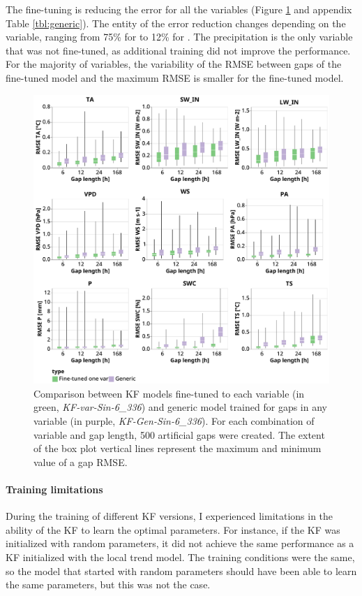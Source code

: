 \documentclass{article}
\newcommand{\imgwidth}{6in}
\begin{document}
The fine-tuning is reducing the error for all the variables (Figure \ref{fig:generic} and appendix Table \ref{tbl:generic}). The entity of the error reduction changes depending on the variable, ranging from 75\% for  to 12\% for .
The precipitation is the only variable that was not fine-tuned, as additional training did not improve the performance.
For the majority of variables, the variability of the RMSE between gaps of the fine-tuned model and the maximum RMSE is smaller for the fine-tuned model.

\begin{figure}
\centerline{\includegraphics[width=\imgwidth]{generic}}
\caption{Comparison between KF models fine-tuned to each variable (in green, \textit{KF-\textlangle var\textrangle-Sin-6\_336}) and generic model trained for gaps in any variable (in purple, \textit{KF-Gen-Sin-6\_336}). For each combination of variable and gap length, 500 artificial gaps were created. The extent of the box plot vertical lines represent the maximum and minimum value of a gap RMSE.}
\label{fig:generic}
\end{figure}

\paragraph{Training limitations} During the training of different KF versions, I experienced limitations in the ability of the KF to learn the optimal parameters. For instance, if the KF was initialized with random parameters, it did not achieve the same performance as a KF initialized with the local trend model. The training conditions were the same, so the model that started with random parameters should have been able to learn the same parameters, but this was not the case.
\end{document}
